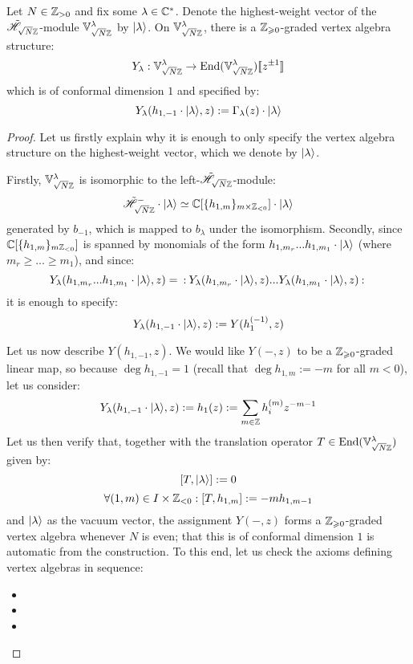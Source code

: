         \begin{proposition} \label{prop: VA_structures_on_rank_1_weyl_vacuum_modules}
            Let $N \in \mathbb{Z}_{> 0}$ and fix some $\lambda \in \mathbb{C}^*$. Denote the highest-weight vector of the $\tilde{\mathscr{H}}_{\sqrt{N} \mathbb{Z}}$-module $\mathbb{V}_{\sqrt{N} \mathbb{Z}}^{\lambda}$ by $\lvert {\lambda} \rangle$. On $\mathbb{V}_{\sqrt{N} \mathbb{Z}}^{\lambda}$, there is a $\mathbb{Z}_{\geqslant 0}$-graded vertex algebra structure:
                $$Y_{\lambda}: \mathbb{V}_{\sqrt{N} \mathbb{Z}}^{\lambda} \to \mathrm{End}(\mathbb{V}_{\sqrt{N} \mathbb{Z}}^{\lambda})[\![z^{\pm 1}]\!]$$
            which is of conformal dimension $1$ and specified by:
                $$Y_{\lambda}(h_{1, -1} \cdot \lvert {\lambda} \rangle, z) := \Gamma_{\lambda}(z) \cdot \lvert {\lambda} \rangle$$
        \end{proposition}
            \begin{proof}
                Let us firstly explain why it is enough to only specify the vertex algebra structure on the highest-weight vector, which we denote by $\lvert {\lambda} \rangle$.
                    
                Firstly, $\mathbb{V}_{\sqrt{N} \mathbb{Z}}^{\lambda}$ is isomorphic to the left-$\tilde{\mathscr{H}}_{\sqrt{N} \mathbb{Z}}$-module:
                    $$\tilde{\scrH}_{\sqrt{N} \Z}^- \cdot \ket{\lambda} \cong \bbC[ \{h_{1, m}\}_{m \x \Z_{< 0}} ] \cdot \ket{\lambda}$$
                generated by $b_{-1}$, which is mapped to $b_{\lambda}$ under the isomorphism. Secondly, since $\mathbb{C}[ \{h_{1, m}\}_{m \mathbb{Z}_{< 0}} ]$ is spanned by monomials of the form $h_{1, m_r} ... h_{1, m_1} \cdot \lvert {\lambda} \rangle$ (where $m_r \geq ... \geq m_1$), and since:
                    $$Y_{\lambda}(h_{1, m_r} ... h_{1, m_1} \cdot \lvert {\lambda} \rangle, z) = \: \mathbf{:} \: { Y_{\lambda}(h_{1, m_r} \cdot \lvert {\lambda} \rangle, z) ... Y_{\lambda}(h_{1, m_1} \cdot \lvert {\lambda} \rangle, z) }  \: \mathbf{:} \:$$
                it is enough to specify:
                    $$Y_{\lambda}(h_{1, -1} \cdot \lvert {\lambda} \rangle, z) := Y(h_1^{(-1)}, z)$$

                Let us now describe $Y(h_{1, -1}, z)$. We would like $Y(-, z)$ to be a $\mathbb{Z}_{\geqslant 0}$-graded linear map, so because $\deg h_{1, -1} = 1$ (recall that $\deg h_{1, m} := -m$ for all $m < 0$), let us consider:
                    $$Y_{\lambda}(h_{1, -1} \cdot \lvert {\lambda} \rangle, z) := h_1(z) := \sum_{m \in \mathbb{Z}} h_i^{(m)} z^{-m - 1}$$
                Let us then verify that, together with the translation operator $T \in \mathrm{End}(\mathbb{V}_{\sqrt{N}\mathbb{Z}}^{\lambda})$ given by:
                    $$[T, \lvert {\lambda} \rangle] := 0$$
                    $$\forall (1, m) \in I \x \Z_{< 0}: [T, h_{1, m}] := -m h_{1, m - 1}$$
                and $\lvert {\lambda} \rangle$ as the vacuum vector, the assignment $Y(-, z)$ forms a $\mathbb{Z}_{\geqslant 0}$-graded vertex algebra whenever $N$ is even; that this is of conformal dimension $1$ is automatic from the construction. To this end, let us check the axioms defining vertex algebras in sequence:
                \begin{itemize}
                    \item 
                    \item 
                    \item 
                \end{itemize}
            \end{proof}

